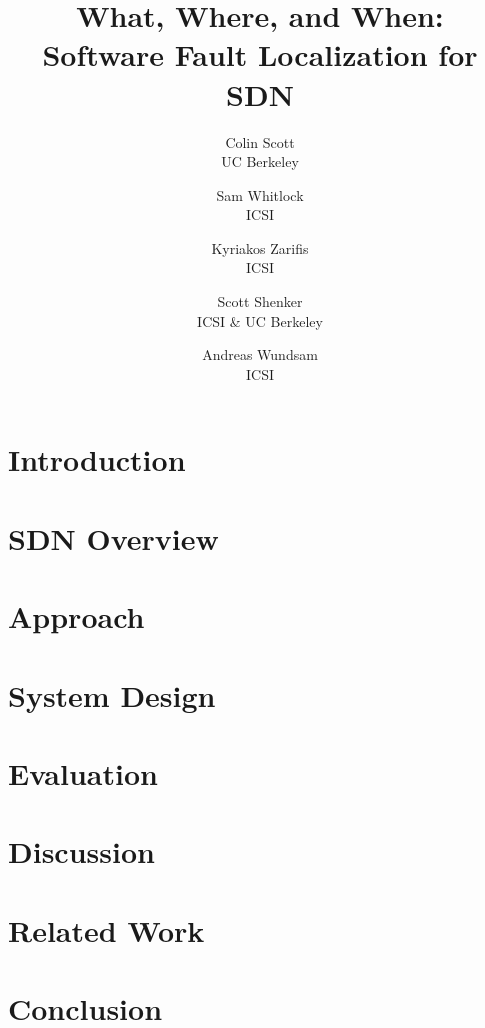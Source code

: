 \documentclass[letterpaper,twocolumn,10pt]{article}
\begin{document}
    \date{}

\title{What, Where, and When: \\ Software Fault Localization for SDN}

\author {
Colin Scott \\
UC Berkeley
\and
Sam Whitlock \\
ICSI
\and
Kyriakos Zarifis \\
ICSI
\and
Scott Shenker \\
ICSI \& UC Berkeley
\and
Andreas Wundsam \\
ICSI
}

    \maketitle

    \thispagestyle{empty}

\abstract{{\it }}

\section{Introduction}
\label{sec:intro}


\section{SDN Overview}
\label{sec:overview}


\section{Approach}
\label{sec:approach}


\section{System Design}
\label{sec:architecture}


\section{Evaluation}
\label{sec:evaluation}


\section{Discussion}
\label{sec:discussion}


\section{Related Work}
\label{sec:related_work}


\section{Conclusion}
\label{sec:conclusion}



 

%

\end{document}
